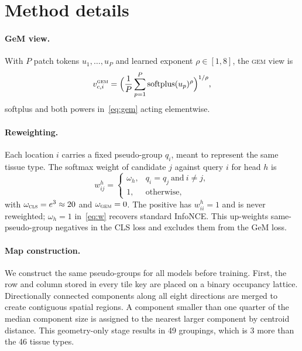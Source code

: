 \appendix

\section{Method details}
\label{app:pseudo}

\paragraph{GeM view.} With $P$ patch tokens $u_1,\dots,u_P$ and learned exponent
$\rho\in[1,8]$, the \textsc{gem} view is
\begin{equation}
v^{\textsc{gem}}_{c,i}
=\Big(\frac{1}{P}\sum_{p=1}^{P}\operatorname{softplus}(u_p)^{\rho}\Big)^{1/\rho},
\label{eq:gem}
\end{equation}
softplus and both powers in~\eqref{eq:gem} acting elementwise.

\paragraph{Reweighting.} Each location $i$ carries a fixed pseudo-group $q_i$, meant to represent
the same tissue type. The softmax weight of candidate $j$ against query $i$ for head $h$ is
\begin{equation}
w^h_{ij}=\begin{cases}
\omega_h,&q_i=q_j\ \text{and}\ i\neq j,\\
1,&\text{otherwise,}
\end{cases}
\label{eq:w}
\end{equation}
with $\omega_{\textsc{cls}}=e^{3}\approx20$ and $\omega_{\textsc{gem}}=0$. The positive has
$w^h_{ii}=1$ and is never reweighted; $\omega_h=1$ in~\eqref{eq:w} recovers standard InfoNCE. This up-weights same-pseudo-group negatives in the CLS loss and excludes them from the GeM loss.

\paragraph{Map construction.} We construct the same pseudo-groups for all models before training. First, the row and column stored in every tile
key are placed on a binary occupancy lattice. 
Directionally connected components along all eight directions are merged to create contiguous spatial regions. 
A component smaller than one quarter of the
median component size is assigned to the nearest larger component by centroid distance. This
geometry-only stage results in 49 groupings, which is 3 more than the 46 tissue types.

